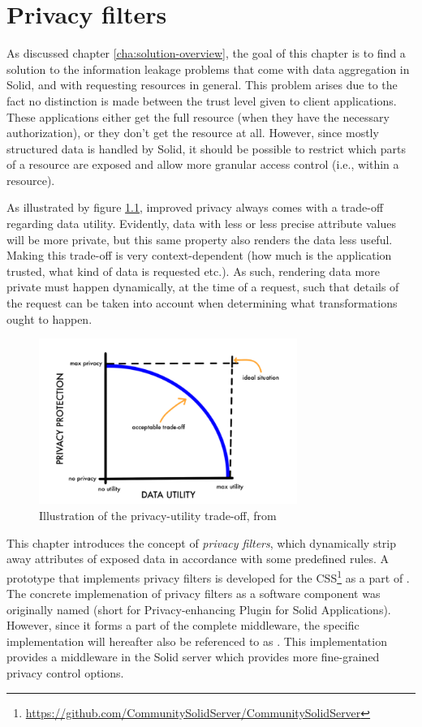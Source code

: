 \chapter{Privacy filters}
\label{cha:privacy-filters}
As discussed chapter \ref{cha:solution-overview}, the goal of this chapter is to find a solution to the information leakage problems that come with data aggregation in Solid, and with requesting resources in general. This problem arises due to the fact no distinction is made between the trust level given to client applications. These applications either get the full resource (when they have the necessary authorization), or they don't get the resource at all. However, since mostly structured data is handled by Solid, it should be possible to restrict which parts of a resource are exposed and allow more granular access control (i.e., within a resource).

As illustrated by figure \ref{fig:privacy-utility-tradeoff}, improved privacy always comes with a trade-off regarding data utility. Evidently, data with less or less precise attribute values will be more private, but this same property also renders the data less useful. Making this trade-off is very context-dependent (how much is the application trusted, what kind of data is requested etc.). As such, rendering data more private must happen dynamically, at the time of a request, such that details of the request can be taken into account when determining what transformations ought to happen.
\begin{figure}[H]
    \centering
    \includegraphics[width=0.75\textwidth]{images/privacy-filter/Data-Privacy-Protection-versus-Data-Utility.png}
    \caption{Illustration of the privacy-utility trade-off, from \citet{datasharing-implications}}
    \label{fig:privacy-utility-tradeoff}
\end{figure}

\noindent This chapter introduces the concept of \textit{privacy filters}, which dynamically strip away attributes of exposed data in accordance with some predefined rules. A prototype that implements privacy filters is developed for the \gls{CSS}\footnote{\url{https://github.com/CommunitySolidServer/CommunitySolidServer}} as a part of \middleware{}. The concrete implemenation of privacy filters as a software component was originally named \mwprivacy{} (short for Privacy-enhancing Plugin for Solid Applications). However, since it forms a part of the complete middleware, the specific implementation will hereafter also be referenced to as \middleware{}. This implementation provides a middleware in the Solid server which provides more fine-grained privacy control options. 

